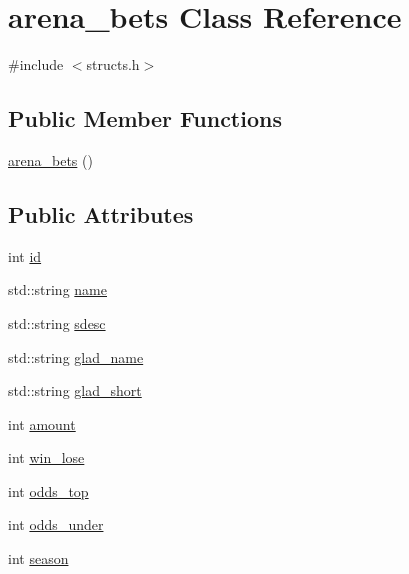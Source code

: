 \hypertarget{classarena__bets}{\section{arena\-\_\-bets Class Reference}
\label{classarena__bets}
}


{\ttfamily \#include $<$structs.\-h$>$}

\subsection*{Public Member Functions}
\begin{DoxyCompactItemize}
\item 
\hyperlink{classarena__bets_aa85ade5ba7c5e5b490b9ae9d8a69ab7d}{arena\-\_\-bets} ()
\end{DoxyCompactItemize}
\subsection*{Public Attributes}
\begin{DoxyCompactItemize}
\item 
int \hyperlink{classarena__bets_aa44079288ae2a5b61d87f586cf9a82b9}{id}
\item 
std\-::string \hyperlink{classarena__bets_a57dd9342f27f9bcae1de156a00d5eb4d}{name}
\item 
std\-::string \hyperlink{classarena__bets_a6aec66c48d66c112748e4469d5a0fa82}{sdesc}
\item 
std\-::string \hyperlink{classarena__bets_abcbf06b48b74f2fe506448b4aff23055}{glad\-\_\-name}
\item 
std\-::string \hyperlink{classarena__bets_a3418818e2a0af7cd69c8b923f9f009e7}{glad\-\_\-short}
\item 
int \hyperlink{classarena__bets_ac225ff8523480dcbf67fdf701d9ce747}{amount}
\item 
int \hyperlink{classarena__bets_a71a18e041b55a367a857bb32283604db}{win\-\_\-lose}
\item 
int \hyperlink{classarena__bets_a5598365011281b69cb364ac783aef13a}{odds\-\_\-top}
\item 
int \hyperlink{classarena__bets_a57b49a707822268cc9a8298563e6b3c7}{odds\-\_\-under}
\item 
int \hyperlink{classarena__bets_a18d8189fc2f483d7b339b44f013659c1}{season}
\end{DoxyCompactItemize}



